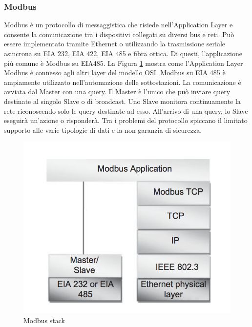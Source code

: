 \subsubsection{Modbus}
Modbus è un protocollo di messaggistica che risiede nell'Application Layer e consente la comunicazione tra i dispositivi collegati su diversi bus e reti. Può essere implementato tramite Ethernet o utilizzando la trasmissione seriale asincrona su EIA 232, EIA 422, EIA 485 e fibra ottica. Di questi, l'applicazione più comune è Modbus su EIA485. La Figura \ref{fig:modbus} mostra come l'Application Layer Modbus è connesso agli altri layer del modello OSI.
Modbus su EIA 485 è ampiamente utilizzato nell'automazione delle sottostazioni. La comunicazione è avviata dal Master con una query. Il Master è l'unico che può inviare query destinate al singolo Slave o di broadcast. Uno Slave monitora continuamente la rete riconoscendo solo le query destinate ad esso. All'arrivo di una query, lo Slave eseguirà un'azione o risponderà. Tra i problemi del protocollo spiccano il limitato supporto alle varie tipologie di dati e la non garanzia di sicurezza.
\begin{figure}[h]
	\centering
	\includegraphics[scale=0.500]{imgs/modbus.png}
	\caption{Modbus stack} \label{fig:modbus}
\end{figure}
\newpage
